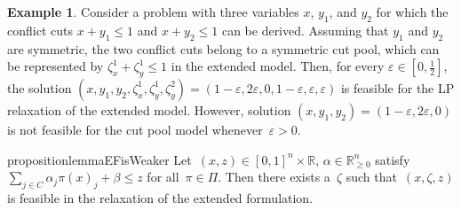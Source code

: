 \documentclass[a4paper,10pt]{article}
\newcommand{\R}{\mathds{R}}
\theoremstyle{definition}
\newtheorem{example}[theorem]{Example}
\begin{document}
\begin{example}
  Consider a problem with three variables $x$, $y_1$, and $y_2$ for which the conflict cuts $x + y_1 \leq 1$ and $x + y_2 \leq 1$ can be derived.
  Assuming that $y_1$ and $y_2$ are symmetric, the two conflict cuts belong to a symmetric cut pool, which can be represented by $\zeta^1_x + \zeta^1_y \leq 1$ in the extended model.
  Then, for every $\varepsilon \in [0,\frac{1}{2}]$, the solution $(x,y_1,y_2,\zeta^1_x,\zeta^1_y,\zeta^2_y) = (1-\varepsilon, 2\varepsilon, 0, 1-\varepsilon,\varepsilon,\varepsilon)$ is feasible for the LP relaxation of the extended model.
  However, solution $(x,y_1,y_2) = (1-\varepsilon,2\varepsilon,0)$ is not feasible for the cut pool model whenever~$\varepsilon > 0$.
\end{example}

\begin{restatable}{proposition}{lemmaEFisWeaker}
  \label{lemma:EF-is-weaker}
  Let~$(x,z)\in[0, 1]^{n}\times\R$, $\alpha\in\R^n_{\geq 0}$ satisfy~$\sum_{j\in C} \alpha_j \pi(x)_j +\beta \leq z$ for all~$\pi\in\Pi$.
  Then there exists a~$\zeta$ such that~$(x,\zeta, z)$ is feasible in the relaxation of the extended formulation.
\end{restatable}
\end{document}
